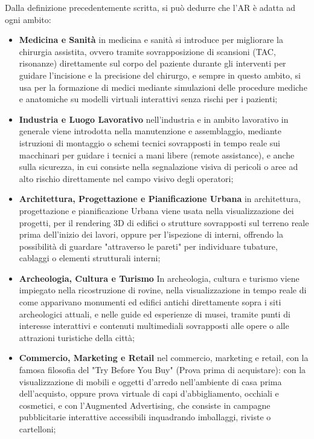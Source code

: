 Dalla definizione precedentemente scritta, si può dedurre che l'AR è adatta ad ogni ambito\cite{augmented-reality-1}: 

\begin{itemize}
    \item[-] \textbf{ Medicina e Sanità} \newline
    in medicina e sanità si introduce per migliorare la chirurgia assistita, ovvero tramite sovrapposizione di scansioni (TAC, risonanze) direttamente sul corpo del paziente durante gli interventi per guidare l'incisione e la precisione del chirurgo, e sempre in questo ambito, si usa per la formazione di medici mediante simulazioni delle procedure mediche e anatomiche su modelli virtuali interattivi senza rischi per i pazienti;

     \item[-] \textbf{ Industria e Luogo Lavorativo} \newline
    nell'industria e in ambito lavorativo in generale viene introdotta nella manutenzione e assemblaggio, mediante istruzioni di montaggio o schemi tecnici sovrapposti in tempo reale sui macchinari per guidare i tecnici a mani libere (remote assistance), e anche sulla sicurezza, in cui consiste nella segnalazione visiva di pericoli o aree ad alto rischio direttamente nel campo visivo degli operatori;

     \item[-] \textbf{ Architettura, Progettazione e Pianificazione Urbana} \newline
    in architettura, progettazione e pianificazione Urbana viene usata nella visualizzazione dei progetti, per il rendering 3D di edifici o strutture sovrapposti sul terreno reale prima dell'inizio dei lavori, oppure per l'ispezione di interni, offrendo la possibilità di guardare "attraverso le pareti" per individuare tubature, cablaggi o elementi strutturali interni;

     \item[-] \textbf{ Archeologia, Cultura e Turismo} \newline
    In archeologia, cultura e turismo viene impiegato nella ricostruzione di rovine, nella visualizzazione in tempo reale di come apparivano monumenti ed edifici antichi direttamente sopra i siti archeologici attuali, e nelle guide ed esperienze di musei, tramite punti di interesse interattivi e contenuti multimediali sovrapposti alle opere o alle attrazioni turistiche della città;

     \item[-] \textbf{Commercio, Marketing e Retail} \newline
    nel commercio, marketing e retail, con la famosa filosofia del "Try Before You Buy" (Prova prima di acquistare): con la visualizzazione di mobili e oggetti d'arredo nell'ambiente di casa prima dell'acquisto, oppure prova virtuale di capi d'abbigliamento, occhiali e cosmetici, e con l'Augmented Advertising, che consiste in campagne pubblicitarie interattive accessibili inquadrando imballaggi, riviste o cartelloni;


\end{itemize}
